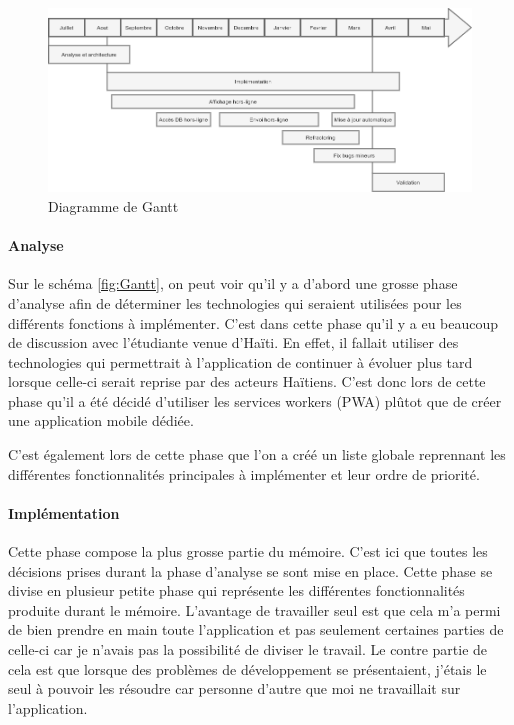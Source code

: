 \documentclass{EPL-master-thesis-covers-FR}
\begin{document}
			\begin{figure}[H]
					\centering
					\includegraphics[width=1\textwidth]{images/Gantt}
					\caption{Diagramme de Gantt}
				\end{figure}
				
			\paragraph*{Analyse}
			Sur le schéma \ref{fig:Gantt}, on peut voir qu'il y a d'abord une grosse phase d'analyse afin de déterminer les technologies qui seraient utilisées pour les différents fonctions à implémenter. C'est dans cette phase qu'il y a eu beaucoup de discussion avec l'étudiante venue d'Haïti. En effet, il fallait utiliser des technologies qui permettrait à l'application de continuer à évoluer plus tard lorsque celle-ci serait reprise par des acteurs Haïtiens.
				C'est donc lors de cette phase qu'il a été décidé d'utiliser les services workers (PWA) plûtot que de créer une application mobile dédiée.
			
			C'est également lors de cette phase que l'on a créé un liste globale reprennant les différentes fonctionnalités principales à implémenter et leur ordre de priorité.
			
			\paragraph*{Implémentation} 
			Cette phase compose la plus grosse partie du mémoire. C'est ici que toutes les décisions prises durant la phase d'analyse se sont mise en place. Cette phase se divise en plusieur petite phase qui représente les différentes fonctionnalités produite durant le mémoire. L'avantage de travailler seul est que cela m'a permi de bien prendre en main toute l'application et pas seulement certaines parties de celle-ci car je n'avais pas la possibilité de diviser le travail. 
			Le contre partie de cela est que lorsque des problèmes de développement se présentaient, j'étais le seul à pouvoir les résoudre car personne d'autre que moi ne travaillait sur l'application. 
			
\end{document}
